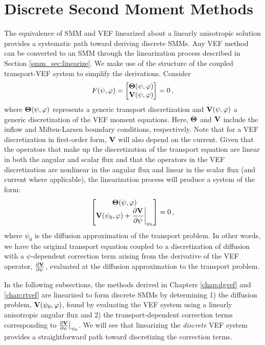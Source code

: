 \documentclass[../doc.tex]{subfiles}
\begin{document}
\section{Discrete Second Moment Methods}
The equivalence of SMM and VEF linearized about a linearly anisotropic solution provides a systematic path toward deriving discrete SMMs. Any VEF method can be converted to an SMM through the linearization process described in Section \ref{smm_sec:linearize}. We make use of the structure of the coupled transport-VEF system to simplify the derivations. Consider
	\begin{equation}
		F(\psi,\varphi) = \begin{bmatrix} 
			\boldsymbol{\mathrm{\Theta}}(\psi,\varphi) \\ \boldsymbol{\mathrm{V}}(\psi,\varphi) 
		\end{bmatrix} = 0\,,
	\end{equation}
where $\boldsymbol{\mathrm{\Theta}}(\psi,\varphi)$ represents a generic transport discretization and $\boldsymbol{\mathrm{V}}(\psi,\varphi)$ a generic discretization of the VEF moment equations. Here, $\boldsymbol{\mathrm{\Theta}}$ and $\boldsymbol{\mathrm{V}}$ include the inflow and Miften-Larsen boundary conditions, respectively. Note that for a VEF discretization in first-order form, $\boldsymbol{\mathrm{V}}$ will also depend on the current. Given that the operators that make up the discretization of the transport equation are linear in both the angular and scalar flux and that the operators in the VEF discretization are nonlinear in the angular flux and linear in the scalar flux (and current where applicable), the linearization process will produce a system of the form: 
	\begin{equation}
		\begin{bmatrix} 
			\boldsymbol{\mathrm{\Theta}}(\psi,\varphi) \\
			\displaystyle\boldsymbol{\mathrm{V}}(\psi_0,\varphi) + \frac{\partial \boldsymbol{\mathrm{V}}}{\partial \psi}\biggr\rvert_{\psi_0}
		\end{bmatrix} = 0 \,, 
	\end{equation}
where $\psi_0$ is the diffusion approximation of the transport problem. 
In other words, we have the original transport equation coupled to a discretization of diffusion with a $\psi$-dependent correction term arising from the derivative of the VEF operator, $\frac{\partial \boldsymbol{\mathrm{V}}}{\partial \psi}$, evaluated at the diffusion approximation to the transport problem. 

In the following subsections, the methods derived in Chapters \ref{chap:dgvef} and \ref{chap:rtvef} are linearized to form discrete SMMs by determining 1) the diffusion problem, $\boldsymbol{\mathrm{V}}(\psi_0, \varphi)$, found by evaluating the VEF system using a linearly anisotropic angular flux and 2) the transport-dependent correction terms corresponding to $\frac{\partial \boldsymbol{\mathrm{V}}}{\partial \psi}\big\rvert_{\psi_0}$. We will see that linearizing the \emph{discrete} VEF system provides a straightforward path toward discretizing the correction terms. 
\end{document}
